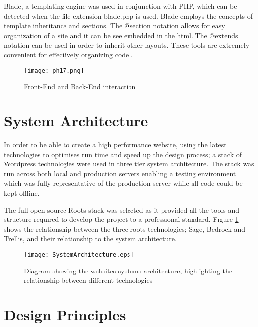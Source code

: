 \documentclass[fontsize=10pt]{extarticle}
\numberwithin{figure}{section} %
\begin{document}
Blade, a templating engine was used in conjunction with PHP, which can
be detected when the file extension blade.php is used. Blade employs the
concepts of template inheritance and sections. The @section notation
allows for easy organization of a site and it can be see embedded in the
html. The @extends notation can be used in order to inherit other
layouts. These tools are extremely convenient for effectively organizing
code \cite{p18} .

\begin{figure}[H]
      \centering
      \texttt{[image: ph17.png]}
      \caption{Front-End and Back-End interaction}
 \end{figure}

\hypertarget{system-architecture}{%
\section{System Architecture}\label{system-architecture}}

In order to be able to create a high performance website, using the
latest technologies to optimises run time and speed up the design
process; a stack of Wordpress technologies were used in three tier
system architecture. The stack was run across both local and production
servers enabling a testing environment which was fully representative of
the production server while all code could be kept offline.

The full open source Roots stack \cite{rootsweb} was selected as it
provided all the tools and structure required to develop the project to
a professional standard. Figure \ref{systemarchitecture} shows the
relationship between the three roots technologies; Sage, Bedrock and
Trellis, and their relationship to the system architecture.

\begin{figure}[H]
\centering
\texttt{[image: SystemArchitecture.eps]}
\caption{Diagram showing the websites systems architecture, highlighting the relationship between different technologies}
\label{systemarchitecture}
\end{figure}

\newpage

\hypertarget{design-principles}{%
\section{Design Principles}\label{design-principles}}
\end{document}
